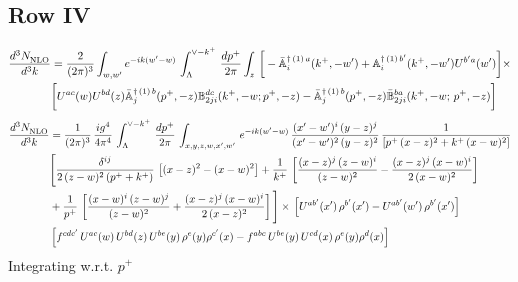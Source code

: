 \documentclass[9pt]{article}
\def\mf#1{\mathbb{#1}}
\numberwithin{equation}{section}
\begin{document}
\subsection{Row IV\,}
\begin{align}
 \frac{d^{3}N_{\rm NLO}^{\rm}}{d^{3}k}  & = \frac{2}{(2\pi)^{3}}  \int_{w, w^\prime} e^{-ik(w^\prime-w)}\, \int_{\Lambda}^{\vee - k^{+}}\,\frac{dp^{+}}{2\pi} \int_{z}\,\bigg[-\bar{\mf{A}}^{\dagger\,(1)\,a}_{i}(k^{+},-w^{\prime})+\mf{A}^{\dagger\, (1)\, b^{\prime}}_{i}(k^{+},-w^{\prime})U^{b^{\prime}a}(w^{\prime})\bigg]\times \notag \\ & \bigg[U^{ac}(w)U^{bd}(z) \bar{\mf{A}}^{\dagger\, (1)\, b}_{j}(p^+,- z) {\mf{B}}^{dc}_{2ji} (k^+, -w;p^+, -z) - \Bar{\mf{A}}^{\dagger\, (1)\, b}_{j}(p^{+}, -z)\Bar{\mf{B}}^{ba}_{2ji}(k^{+},-w;\,p^{+}, -z) \bigg] \nonumber
\end{align}
\begin{align}
    \frac{d^{3}N_{\rm NLO}^{\rm}}{d^{3}k}  & = \frac{1}{(2\pi)^{3}}\,\frac{ig^{4}}{4\pi^{4}}\, \int_{\Lambda}^{\vee-k^{+}}\, \frac{dp^{+}}{2\pi}\, \int_{x,y,z,w,x',w'}\,e^{-ik(w^\prime-w)}\, \frac{(x'-w')^{i}\,(y-z)^{j}}{(x'-w')^{2}\,(y-z)^{2}}\, \frac{1}{\left[p^{+}\,(x-z)^{2}+k^{+}\,(x-w)^{2}\right]}\notag \\ & \Bigg[\frac{\delta^{ij}}{2\,(z-w)^{2}\,(p^{+}+k^{+})}\, \left[(x-z)^{2}-(x-w)^{2}\right]+\frac{1}{k^{+}}\,\left[\frac{(x-z)^{j}\,(z-w)^{i}}{(z-w)^{2}}-\frac{(x-z)^{j}\,(x-w)^{i}}{2\,(x-w)^{2}}\right]\notag \\ & + \frac{1}{p^{+}}\, \left[\frac{(x-w)^{i}\,(z-w)^{j}}{(z-w)^{2}}+\frac{(x-z)^{j}\,(x-w)^{i}}{2\,(x-z)^{2}}\right]\Bigg]\times\, \left[U^{ab'}(x')\,\rho^{b'}(x')-U^{ab'}(w')\,\rho^{b'}(x')\right]\notag \\ & \left[f^{cdc'}\,U^{ac}(w)\,U^{bd}(z)\,U^{be}(y)\,\rho^{e}(y)\rho^{c'}(x)-f^{abc}\,U^{be}(y)\,U^{cd}(x)\,\rho^{e}(y)\rho^{d}(x)\right] %
\end{align}
Integrating w.r.t. $p^{+}$
\end{document}
